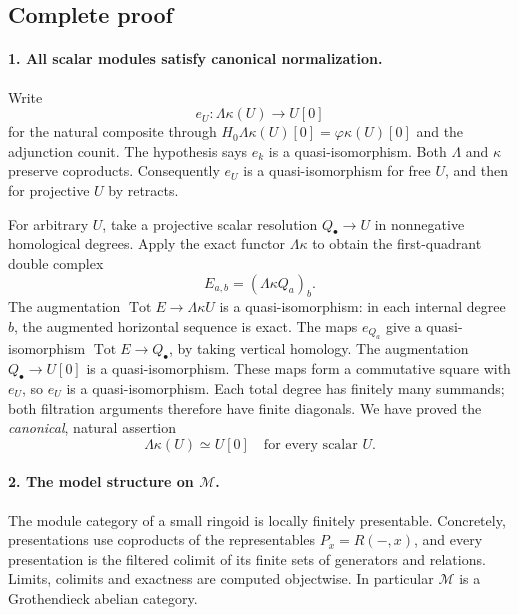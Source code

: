 \documentclass[11pt,a4paper]{article}
\theoremstyle{definition}\newtheorem{definition}[theorem]{Definition}
\theoremstyle{remark}\newtheorem{remark}[theorem]{Remark}
\begin{document}
\subsection{Complete proof}

\paragraph{1. All scalar modules satisfy canonical normalization.}
Write
\[
 e_U:\Lambda\kappa(U)\longrightarrow U[0]
 \tag{SM29.2}
\]
for the natural composite through
\(H_0\Lambda\kappa(U)[0]=\varphi\kappa(U)[0]\) and the adjunction
counit.  The hypothesis says \(e_k\) is a quasi-isomorphism.
Both \(\Lambda\) and \(\kappa\) preserve coproducts.
Consequently \(e_U\) is a quasi-isomorphism for free \(U\), and
then for projective \(U\) by retracts.

For arbitrary \(U\), take a projective scalar resolution
\(Q_\bullet\to U\) in nonnegative homological degrees.
Apply the exact functor \(\Lambda\kappa\) to obtain the
first-quadrant double complex
\[
 E_{a,b}=(\Lambda\kappa Q_a)_b.
\]
The augmentation
\(\operatorname{Tot}E\to\Lambda\kappa U\) is a quasi-isomorphism:
in each internal degree \(b\), the augmented horizontal sequence
is exact.  The maps \(e_{Q_a}\) give a quasi-isomorphism
\(\operatorname{Tot}E\to Q_\bullet\), by taking vertical homology.
The augmentation \(Q_\bullet\to U[0]\) is a quasi-isomorphism.
These maps form a commutative square with \(e_U\), so \(e_U\)
is a quasi-isomorphism.  Each total degree has finitely many
summands; both filtration arguments therefore have finite
diagonals.  We have proved the \emph{canonical}, natural assertion
\[
 \Lambda\kappa(U)\simeq U[0]\quad\text{for every scalar }U.
 \tag{SM29.3}
\]

\paragraph{2. The model structure on \(\mathcal M\).}
The module category of a small ringoid is locally finitely
presentable.  Concretely, presentations use coproducts of the
representables \(P_x=R(-,x)\), and every presentation is the filtered
colimit of its finite sets of generators and relations.  Limits,
colimits and exactness are computed objectwise.
In particular \(\mathcal M\) is a Grothendieck abelian category.
\end{document}
